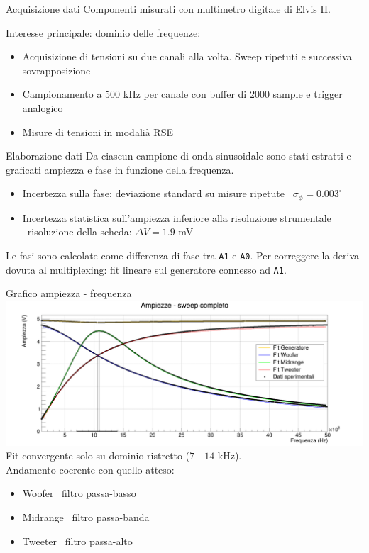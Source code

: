 \documentclass[italian]{beamer}
\begin{document}
\begin{frame}{Acquisizione dati}
    Componenti misurati con multimetro digitale di Elvis II.

    \bigskip
    Interesse principale: dominio delle frequenze:
    \begin{itemize}
        \item Acquisizione di tensioni su due canali alla volta. Sweep ripetuti e successiva sovrapposizione
        \item Campionamento a $500$ kHz per canale con buffer di $2000$ sample e trigger analogico
        \item Misure di tensioni in modalià RSE
    \end{itemize}

\end{frame}
\begin{frame}{Elaborazione dati}
    Da ciascun campione di onda sinusoidale sono stati estratti e graficati ampiezza e fase in funzione della frequenza.

    \begin{itemize}
        \item Incertezza sulla fase: deviazione standard su misure ripetute \rightarrow\ $\sigma_\phi = 0.003^\circ$
        \item Incertezza statistica sull'ampiezza inferiore alla risoluzione strumentale
              \rightarrow\ risoluzione della scheda: $\Delta V = 1.9$ mV
    \end{itemize}

    Le fasi sono calcolate come differenza di fase tra \texttt{A1} e \texttt{A0}.
    Per correggere la deriva dovuta al multiplexing: fit lineare sul generatore connesso ad \texttt{A1}.
\end{frame}

\begin{frame}{Grafico ampiezza - frequenza}
    \includegraphics[width=\textwidth]{fig_amp.png}
    Fit convergente solo su dominio ristretto ($7$ - $14$ kHz).\\
    Andamento coerente con quello atteso:
    \begin{itemize}
        \item[\checkmark] Woofer \rightarrow\ filtro passa-basso
        \item[\checkmark] Midrange \rightarrow\ filtro passa-banda
        \item[\checkmark] Tweeter \rightarrow\ filtro passa-alto
    \end{itemize}
\end{frame}
\end{document}
